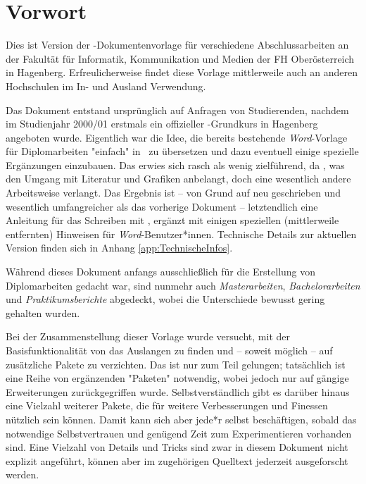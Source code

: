 \chapter{Vorwort} 	%


Dies ist Version \textbf{\hgbDate} der \latex-Dokumentenvorlage für
verschiedene Abschlussarbeiten an der Fakultät für Informatik, Kommunikation
und Medien der FH Oberösterreich in Hagenberg. Erfreulicherweise findet
diese Vorlage mittlerweile auch an anderen Hochschulen im In- und Ausland
Verwendung.

Das Dokument entstand ursprünglich auf Anfragen von Studierenden, nachdem im
Studienjahr 2000/01 erstmals ein offizieller \latex-Grundkurs in Hagenberg 
angeboten wurde. Eigentlich war die Idee, die bereits bestehende 
\emph{Word}-Vorlage für Diplomarbeiten "einfach" in \latex\ zu übersetzen 
und dazu eventuell einige spezielle Ergänzungen einzubauen. 
Das erwies sich rasch als wenig zielführend, da
\latex, \va was den Umgang mit Literatur und Grafiken anbelangt, doch eine
wesentlich andere Arbeitsweise verlangt. Das Ergebnis ist -- von Grund auf
neu geschrieben und wesentlich umfangreicher als das vorherige Dokument --
letztendlich eine Anleitung für das Schreiben mit \latex, ergänzt mit einigen
speziellen (mittlerweile entfernten) Hinweisen für \emph{Word}-Benutzer*innen. 
Technische Details zur aktuellen Version finden sich in Anhang
\ref{app:TechnischeInfos}.

Während dieses Dokument anfangs ausschließlich für die Erstellung von
Diplomarbeiten gedacht war, sind nunmehr auch \emph{Masterarbeiten},
\emph{Bachelor\-arbeiten} und \emph{Praktikumsberichte} abgedeckt, wobei die
Unterschiede bewusst gering gehalten wurden.

Bei der Zusammenstellung dieser Vorlage wurde versucht, mit der
Basisfunktionalität von \latex das Auslangen zu finden und -- soweit möglich
-- auf zusätzliche Pakete zu verzichten. Das ist nur zum Teil gelungen;
tat\-säch\-lich ist eine Reihe von ergänzenden "Paketen" notwendig, wobei
jedoch nur auf gängige Erweiterungen zurückgegriffen wurde.
Selbstverständlich gibt es darüber hinaus eine Vielzahl weiterer Pakete, die
für weitere Verbesserungen und Finessen nützlich sein können. Damit kann sich
aber jede*r selbst beschäftigen, sobald das notwendige Selbstvertrauen und
genügend Zeit zum Experimentieren vorhanden sind. Eine Vielzahl von Details
und Tricks sind zwar in diesem Dokument nicht explizit angeführt, können aber
im zugehörigen Quelltext jederzeit ausgeforscht werden.

